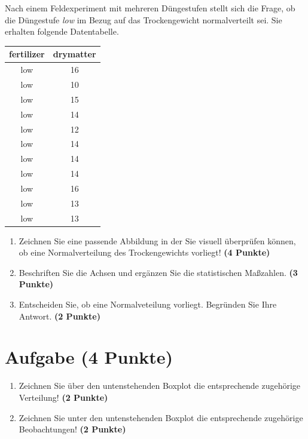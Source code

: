 \documentclass[a4paper, 10pt]{scrartcl}\usepackage[]{graphicx}\usepackage[]{xcolor}
\begin{document}
Nach einem Feldexperiment mit mehreren D{\"u}ngestufen stellt sich die Frage,
ob die D{\"u}ngestufe \textit{low} im Bezug auf das Trockengewicht
normalverteilt sei. Sie erhalten folgende Datentabelle.

\begin{table}[!h]
\centering
\begin{tabular}{cc}
\toprule
fertilizer & drymatter\\
\midrule
low & 16\\
low & 10\\
low & 15\\
low & 14\\
low & 12\\
\addlinespace
low & 14\\
low & 14\\
low & 14\\
low & 16\\
low & 13\\
\addlinespace
low & 13\\
\bottomrule
\end{tabular}
\end{table}



\begin{enumerate}
\item Zeichnen Sie eine passende Abbildung in der Sie visuell {\"u}berpr{\"u}fen
  k{\"o}nnen, ob eine Normalverteilung des Trockengewichts vorliegt! \textbf{(4
    Punkte)}
\item Beschriften Sie die Achsen und erg{\"a}nzen Sie die statistischen
  Ma{\ss}zahlen. \textbf{(3 Punkte)}
\item Entscheiden Sie, ob eine Normalveteilung vorliegt. Begr{\"u}nden Sie Ihre
  Antwort. \textbf{(2 Punkte)}
\end{enumerate} 
\clearpage

\section{Aufgabe \hfill (4 Punkte)}



\begin{enumerate}
\item Zeichnen Sie {\"u}ber den untenstehenden Boxplot die entsprechende
  zugeh{\"o}rige Verteilung! \textbf{(2 Punkte)} 
\item Zeichnen Sie unter den untenstehenden Boxplot die entsprechende
  zugeh{\"o}rige Beobachtungen! \textbf{(2 Punkte)}
\end{enumerate}
\end{document}
